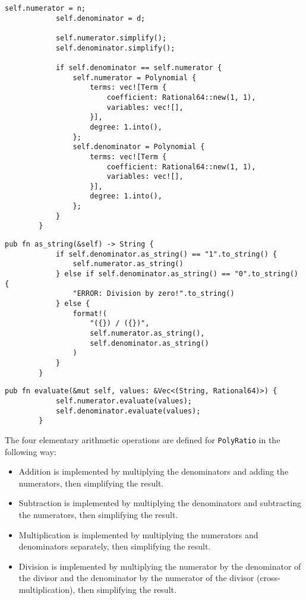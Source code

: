 {\begin{lstlisting}[caption={The implementation of the \texttt{simplify()} method for the \texttt{PolyRatio} struct}, label={lst:polyratio-simplify}]
            self.numerator = n;
            self.denominator = d;
    
            self.numerator.simplify();
            self.denominator.simplify();
    
            if self.denominator == self.numerator {
                self.numerator = Polynomial {
                    terms: vec![Term {
                        coefficient: Rational64::new(1, 1),
                        variables: vec![],
                    }],
                    degree: 1.into(),
                };
                self.denominator = Polynomial {
                    terms: vec![Term {
                        coefficient: Rational64::new(1, 1),
                        variables: vec![],
                    }],
                    degree: 1.into(),
                };
            }
        }
    \end{lstlisting}

    \begin{lstlisting}[caption={The implementation of the \texttt{as\_string()} method for the \texttt{PolyRatio} struct}, label={lst:polyratio-as-string}]
        pub fn as_string(&self) -> String {
            if self.denominator.as_string() == "1".to_string() {
                self.numerator.as_string()
            } else if self.denominator.as_string() == "0".to_string() {
                "ERROR: Division by zero!".to_string()
            } else {
                format!(
                    "({}) / ({})",
                    self.numerator.as_string(),
                    self.denominator.as_string()
                )
            }
        }
    \end{lstlisting}

    \begin{lstlisting}[caption={The implementation of the \texttt{evaluate()} method for the \texttt{PolyRatio} struct}, label={lst:polyratio-evaluate}]
        pub fn evaluate(&mut self, values: &Vec<(String, Rational64)>) {
            self.numerator.evaluate(values);
            self.denominator.evaluate(values);
        }
    \end{lstlisting}
}

The four elementary arithmetic operations are defined for \verb|PolyRatio| in the following way:
\begin{itemize}
    \item Addition is implemented by multiplying the denominators and adding the numerators, then simplifying the result.
    \item Subtraction is implemented by multiplying the denominators and subtracting the numerators, then simplifying the result.
    \item Multiplication is implemented by multiplying the numerators and denominators separately, then simplifying the result.
    \item Division is implemented by multiplying the numerator by the denominator of the divisor and the denominator by the numerator of the divisor (cross-multiplication), then simplifying the result. 
\end{itemize}

